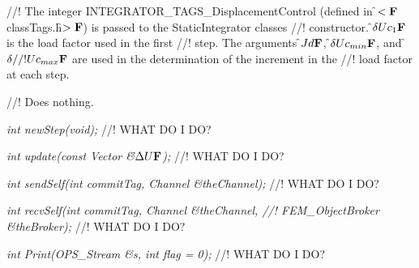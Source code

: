 //! The integer INTEGRATOR\_TAGS\_DisplacementControl (defined in
\f$<{\bf F}$classTags.h\f$>{\bf F}$) is passed to the StaticIntegrator classes
//! constructor. \f$\delta Uc_1{\bf F}$ is the load factor used in the first
//! step. The arguments \f$Jd{\bf F}$, \f$\delta Uc_{min}{\bf F}$, and \f$\delta
//! Uc_{max}{\bf F}$ are used in the determination of the increment in the
//! load factor at each step.



//! Does nothing.


{\em int newStep(void);}
//! WHAT DO I DO?

{\em int update(const Vector \&\f$\Delta U{\bf F}$);}
//! WHAT DO I DO?

{\em int sendSelf(int commitTag, Channel \&theChannel); } 
//! WHAT DO I DO?

{\em int recvSelf(int commitTag, Channel \&theChannel, 
//! FEM\_ObjectBroker \&theBroker); } 
//! WHAT DO I DO?

{\em int Print(OPS\_Stream \&s, int flag = 0);}
//! WHAT DO I DO?
